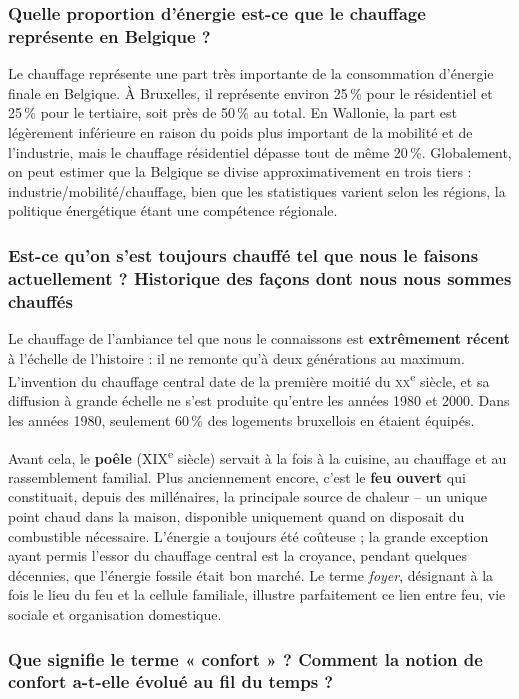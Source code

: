 \subsubsection{Quelle proportion d'énergie est-ce que le chauffage représente en Belgique ?}

Le chauffage représente une part très importante de la consommation d'énergie finale en Belgique. À Bruxelles, il représente environ 25\,\% pour le résidentiel et 25\,\% pour le tertiaire, soit près de 50\,\% au total. En Wallonie, la part est légèrement inférieure en raison du poids plus important de la mobilité et de l'industrie, mais le chauffage résidentiel dépasse tout de même 20\,\%. Globalement, on peut estimer que la Belgique se divise approximativement en trois tiers : industrie/mobilité/chauffage, bien que les statistiques varient selon les régions, la politique énergétique étant une compétence régionale.

\subsubsection{Est-ce qu'on s'est toujours chauffé tel que nous le faisons actuellement ? Historique des façons dont nous nous sommes chauffés}

Le chauffage de l'ambiance tel que nous le connaissons est \textbf{extrêmement récent} à l'échelle de l'histoire : il ne remonte qu'à deux générations au maximum. L'invention du chauffage central date de la première moitié du \textsc{xx}\textsuperscript{e} siècle, et sa diffusion à grande échelle ne s'est produite qu'entre les années 1980 et 2000. Dans les années 1980, seulement 60\,\% des logements bruxellois en étaient équipés.

Avant cela, le \textbf{poêle} (XIX\textsuperscript{e} siècle) servait à la fois à la cuisine, au chauffage et au rassemblement familial. Plus anciennement encore, c'est le \textbf{feu ouvert} qui constituait, depuis des millénaires, la principale source de chaleur -- un unique point chaud dans la maison, disponible uniquement quand on disposait du combustible nécessaire. L'énergie a toujours été coûteuse ; la grande exception ayant permis l'essor du chauffage central est la croyance, pendant quelques décennies, que l'énergie fossile était bon marché. Le terme \textit{foyer}, désignant à la fois le lieu du feu et la cellule familiale, illustre parfaitement ce lien entre feu, vie sociale et organisation domestique.

\subsubsection{Que signifie le terme « confort » ? Comment la notion de confort a-t-elle évolué au fil du temps ?}

